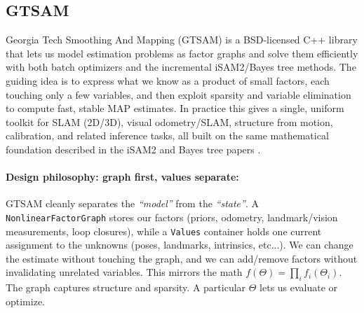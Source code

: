 \subsection{GTSAM}
Georgia Tech Smoothing And Mapping (GTSAM) is a BSD-licensed C++ library that lets us model estimation problems as factor graphs and solve them efficiently with both batch optimizers and the incremental iSAM2/Bayes tree methods. The guiding idea is to express what we know as a product of small factors, each touching only a few variables, and then exploit sparsity and variable elimination to compute fast, stable MAP estimates. In practice this gives a single, uniform toolkit for SLAM (2D/3D), visual odometry/SLAM, structure from motion, calibration, and related inference tasks, all built on the same mathematical foundation described in the iSAM2 and Bayes tree papers \cite{GTSAM_handbook,iSAM2_paper,Bayes_tree_for_SLAM_paper}.

\paragraph{Design philosophy: graph first, values separate:}
GTSAM cleanly separates the \textit{``model''} from the \textit{``state''}. A \texttt{NonlinearFactorGraph} stores our factors (priors, odometry, landmark/vision measurements, loop closures), while a \texttt{Values} container holds one current assignment to the unknowns (poses, landmarks, intrinsics, etc...). We can change the estimate without touching the graph, and we can add/remove factors without invalidating unrelated variables. This mirrors the math $f(\Theta)=\prod_i f_i(\Theta_i)$. The graph captures structure and sparsity. A particular $\Theta$ lets us evaluate or optimize. \cite{GTSAM_handbook}

